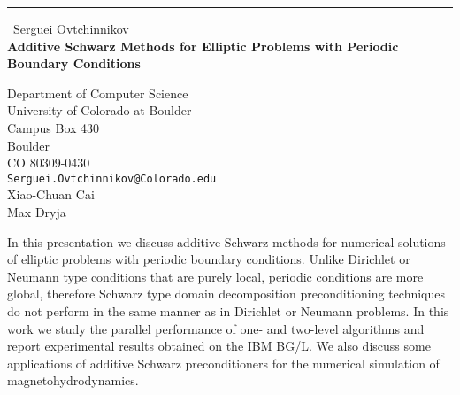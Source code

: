 \documentclass{report}
\begin{document}
\begin{center}
\rule{6in}{1pt} \
{\large Serguei Ovtchinnikov \\
{\bf Additive Schwarz Methods for Elliptic Problems with Periodic Boundary Conditions}}

Department of Computer Science \\ University of Colorado at Boulder \\ Campus Box 430 \\ Boulder \\ CO 80309-0430
\\
{\tt Serguei.Ovtchinnikov@Colorado.edu}\\
Xiao-Chuan Cai\\
Max Dryja\end{center}

In this presentation we discuss additive Schwarz methods for numerical
solutions of elliptic problems with periodic
boundary conditions. Unlike Dirichlet or Neumann type conditions that are
purely local, periodic conditions are
more global, therefore Schwarz type domain decomposition preconditioning
techniques do not perform in the same manner
as in Dirichlet or Neumann problems. In this work we study the parallel
performance of one- and two-level algorithms and report experimental
results obtained on the IBM BG/L. We also discuss some applications of
additive Schwarz preconditioners for the numerical simulation of
magnetohydrodynamics.
\end{document}
